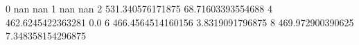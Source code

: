 0 nan nan
1 nan nan
2 531.340576171875 68.71603393554688
4 462.6245422363281 0.0
6 466.4564514160156 3.8319091796875
8 469.972900390625 7.348358154296875
